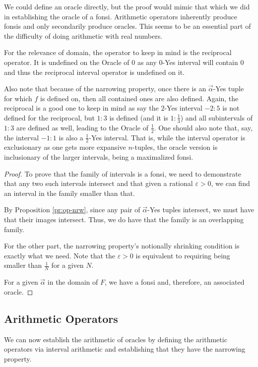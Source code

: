 \documentclass[12pt]{article}
\begin{document}
We could define an oracle directly, but the proof would mimic that which we did in establishing the oracle of a fonsi. Arithmetic operators inherently produce fonsis and only secondarily produce oracles. This seems to be an essential part of the difficulty of doing arithmetic with real numbers. 

For the relevance of domain, the operator to keep in mind is the reciprocal operator. It is undefined on the Oracle of 0 as any 0-Yes interval will contain 0 and thus the reciprocal interval operator is undefined on it. 

Also note that because of the narrowing property, once there is an $\vec{\alpha}$-Yes tuple for which $f$ is defined on, then all contained ones are also defined. Again, the reciprocal is a good one to keep in mind as say the $2$-Yes interval $-2:5$ is not defined for the reciprocal, but $1:3$ is defined (and it is $1:\frac{1}{3}$) and all subintervals of $1:3$ are defined as well, leading to the Oracle of $\frac{1}{2}$. One should also note that, say, the interval $-1:1$ is also a $\frac{1}{2}$-Yes interval. That is, while the interval operator is exclusionary as one gets more expansive $n$-tuples, the oracle version is inclusionary of the larger intervals, being a maximalized fonsi. 

\begin{proof}
To prove that the family of intervals is a fonsi, we need to demonstrate that any two such intervals intersect and that given a rational $\varepsilon > 0$, we can find an interval in the family smaller than that. 

By Proposition \ref{pr:op-nrw}, since any pair of $\vec{\alpha}$-Yes tuples intersect, we must have that their images intersect. Thus, we do have that the family is an overlapping family. 

For the other part, the narrowing property's notionally shrinking condition is exactly what we need. Note that the $\varepsilon > 0$ is equivalent to requiring being smaller than $\frac{1}{N}$ for a given $N$.

For a given $\vec{\alpha}$ in the domain of $F$, we have a fonsi and, therefore, an associated oracle.
\end{proof}


\subsection{Arithmetic Operators}

We can now establish the arithmetic of oracles by defining the arithmetic operators via interval arithmetic and establishing that they have the narrowing property.
\end{document}
